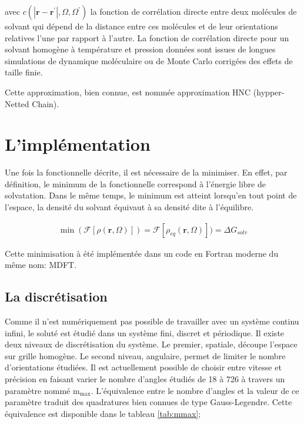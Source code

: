 \noindent avec $c\left( \left|\boldsymbol{r}-\boldsymbol{r}^\prime\right|,\Omega,\Omega^\prime \right) $ la fonction de corrélation directe entre deux molécules de solvant qui dépend de la distance entre ces molécules et de leur orientations relatives l'une par rapport à l'autre. La fonction de corrélation directe pour un solvant homogène à température et pression données sont issues de longues simulations de dynamique moléculaire ou de Monte Carlo corrigées des effets de taille finie\cite{Puibasset_bridge_2012, belloni_unpublished}.

Cette approximation, bien connue, est nommée approximation HNC (hypper-Netted Chain)\cite{hansen_theory_2006}. 


\section{L'implémentation}
Une fois la fonctionnelle décrite, il est nécessaire de la minimiser. En effet, par définition, le minimum de la fonctionnelle correspond à l'énergie libre de solvatation. Dans le même temps, le minimum est atteint lorsqu'en tout point de l'espace, la densité du solvant équivaut à sa densité dite à l'équilibre.

\begin{eqnarray}
\min(\mathcal{F}[\rho\left(\boldsymbol{r},\Omega \right)]) = \mathcal{F}[\rho_{eq}\left(\boldsymbol{r},\Omega \right)])= \Delta G_{solv}
\end{eqnarray}

Cette minimisation à été implémentée dans un code en Fortran moderne du même nom: MDFT.


\subsection{La discrétisation}
Comme il n'est numériquement pas possible de travailler avec un système continu infini, le soluté est étudié dans un système fini, discret et périodique. Il existe deux niveaux de discrétisation du système. Le premier, spatiale, découpe l'espace sur grille homogène. Le second niveau, angulaire\cite{ding_cea-01564512}, permet de limiter le nombre d'orientations étudiées. Il est actuellement possible de choisir entre vitesse et précision en faisant varier le nombre d'angles étudiés de 18 à 726 à travers un paramètre nommé $\mathrm{m}_\mathrm{max}$. L'équivalence entre le nombre d'angles et la valeur de ce paramètre traduit des quadratures bien connues de type Gauss-Legendre\cite{abbott_tricks_2005}. Cette équivalence est disponible dans le tableau \ref{tab:mmax};

